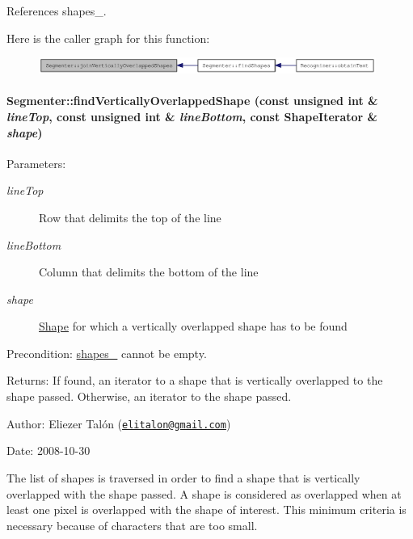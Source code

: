 References shapes\_\-.

Here is the caller graph for this function:\nopagebreak
\begin{figure}[H]
\begin{center}
\leavevmode
\includegraphics[width=313pt]{class_segmenter_a6fc98922155143cf36f542118c33f3a_icgraph}
\end{center}
\end{figure}
\hypertarget{class_segmenter_0961de0db6a0b1de51882024bfc830a1}{
\paragraph[findVerticallyOverlappedShape]{ Segmenter::findVerticallyOverlappedShape (const unsigned int \& {\em lineTop}, \/  const unsigned int \& {\em lineBottom}, \/  const {\bf ShapeIterator} \& {\em shape})}\hfill}
\label{class_segmenter_0961de0db6a0b1de51882024bfc830a1}


\begin{Desc}
\item[Parameters:]
\begin{description}
\item[{\em lineTop}]Row that delimits the top of the line \item[{\em lineBottom}]Column that delimits the bottom of the line \item[{\em shape}]\hyperlink{class_shape}{Shape} for which a vertically overlapped shape has to be found\end{description}
\end{Desc}
\begin{Desc}
\item[Precondition:]\hyperlink{class_segmenter_41b94ede2829063e0937dc150756e77e}{shapes\_\-} cannot be empty.\end{Desc}
\begin{Desc}
\item[Returns:]If found, an iterator to a shape that is vertically overlapped to the shape passed. Otherwise, an iterator to the shape passed.\end{Desc}
\begin{Desc}
\item[Author:]Eliezer Talón (\href{mailto:elitalon@gmail.com}{\tt elitalon@gmail.com}) \end{Desc}
\begin{Desc}
\item[Date:]2008-10-30\end{Desc}
The list of shapes is traversed in order to find a shape that is vertically overlapped with the shape passed. A shape is considered as overlapped when at least one pixel is overlapped with the shape of interest. This minimum criteria is necessary because of characters that are too small. 

